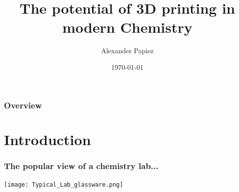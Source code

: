 \documentclass[10pt, compress]{beamer}
\title{The potential of 3D printing in modern Chemistry}
\date{\today}
\author{Alexander Papiez}
\institute{Northumbria University}
\begin{document}
\maketitle

\begin{frame}[fragile]
  \frametitle{Overview}
  \vspace{-1cm}
	\tableofcontents
  
\end{frame}

\section{Introduction}

\begin{frame}[fragile]
  \frametitle{The popular view of a chemistry lab...}
  \centering\texttt{[image: Typical\_Lab\_glassware.png]}
  
\end{frame}


\end{document}
